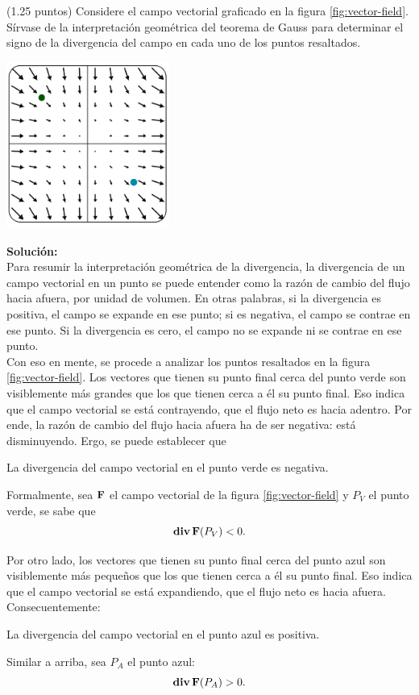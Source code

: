 \documentclass{fmbvecto}
\begin{document}
\begin{problema}
    
    (1.25 puntos) Considere el campo vectorial graficado en la figura \ref{fig:vector-field}. Sírvase de la interpretación geométrica del teorema de Gauss para determinar el signo de la divergencia del campo en cada uno de los puntos resaltados.

    \begin{center}
    \includegraphics[width=0.4\textwidth]{vector-field.png}
    \label{fig:vector-field}
    \end{center}

\tcblower
\textbf{Solución:}\\

Para resumir la interpretación geométrica de la divergencia, la divergencia de un campo vectorial en un punto se puede entender como la razón de cambio del flujo hacia afuera, por unidad de volumen. En otras palabras, si la divergencia es positiva, el campo se expande en ese punto; si es negativa, el campo se contrae en ese punto. Si la divergencia es cero, el campo no se expande ni se contrae en ese punto. \\

Con eso en mente, se procede a analizar los puntos resaltados en la figura \ref{fig:vector-field}. Los vectores que tienen su punto final cerca del punto verde son visiblemente más grandes que los que tienen cerca a él su punto final. Eso indica que el campo vectorial se está contrayendo, que el flujo neto es hacia adentro. Por ende, la razón de cambio del flujo hacia afuera ha de ser negativa: está disminuyendo. Ergo, se puede establecer que
\begin{gbox}
    La divergencia del campo vectorial en el punto verde es negativa.
\end{gbox}
Formalmente, sea \(\boldsymbol{{\mathbf{F}}}\) el campo vectorial de la figura \ref{fig:vector-field} y \(P_V\) el punto verde, se sabe que
\[
\operatorname{\mathbf{div}} \boldsymbol{{\mathbf{F}}}(P_V) < 0.
\]

Por otro lado, los vectores que tienen su punto final cerca del punto azul son visiblemente más pequeños que los que tienen cerca a él su punto final. Eso indica que el campo vectorial se está expandiendo, que el flujo neto es hacia afuera. Consecuentemente:
\begin{gbox}
    La divergencia del campo vectorial en el punto azul es positiva.
\end{gbox}
Similar a arriba, sea \(P_A\) el punto azul:
\[
\operatorname{\mathbf{div}} \boldsymbol{{\mathbf{F}}}(P_A) > 0.
\]

\end{problema}
\end{document}
